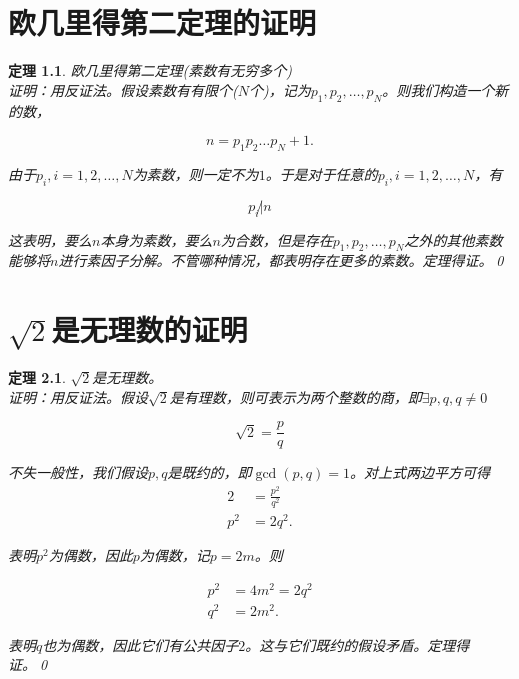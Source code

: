 \appendix
\newtheorem{theorem}{定理}

\chapter{欧几里得第二定理的证明}
	\begin{theorem}
		欧几里得第二定理(素数有无穷多个)\\
		证明：用反证法。假设素数有有限个($N$个)，记为$p_1,p_2,\dots,p_N$。则我们构造一个新的数，
		
		\[n=p_1p_2\dots p_N+1.\] 
		
		由于$p_i,i=1,2,\dots,N$为素数，则一定不为$1$。于是对于任意的$p_i,i=1,2,\dots, N$，有 
		
		\[p_i\not|n\] 
		
		这表明，要么$n$本身为素数，要么$n$为合数，但是存在$p_1,p_2,\dots,p_N$之外的其他素数能够将$n$进行素因子分解。不管哪种情况，都表明存在更多的素数。定理得证。\qed
	\end{theorem}

\chapter{$\sqrt{2}$是无理数的证明}
	\begin{theorem}
		$\sqrt{2}$是无理数。\\
		证明：用反证法。假设$\sqrt{2}$是有理数，则可表示为两个整数的商，即$\exists p,q, q\ne0$ 
		
		\[\sqrt{2}=\frac{p}{q}\] 
		
		不失一般性，我们假设$p,q$是既约的，即$\gcd(p,q)=1$。对上式两边平方可得\\
		
		\begin{align*}
			2& =\frac{p^2}{q^2}\\
			p^2&=2q^2.
		\end{align*}
		
		表明$p^2$为偶数，因此$p$为偶数，记$p=2m$。则
		
		\begin{align*}
			p^2&=4m^2=2q^2\\
			q^2&=2m^2.
		\end{align*}
		
		表明$q$也为偶数，因此它们有公共因子$2$。这与它们既约的假设矛盾。定理得证。\qed
	\end{theorem}